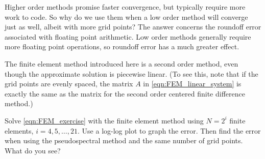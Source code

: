 \begin{problem}
\label{prob:FEM_accuracy_comparison}
Higher order methods promise faster convergence, but typically require more work to code.
So why do we use them when a low order method will converge just as well, albeit with more grid points?
The answer concerns the roundoff error associated with floating point arithmetic.
Low order methods generally require more floating point operations, so roundoff error has a much greater effect.

The finite element method introduced here is a second order method, even though the approximate solution is piecewise linear.
(To see this, note that if the grid points are evenly spaced, the matrix $A$ in \eqref{eqn:FEM_linear_system} is exactly the same as the matrix for the second order centered finite difference method.)

Solve \eqref{eqn:FEM_exercise} with the finite element method using $N = 2^i$  finite elements, $i = 4, 5, \ldots, 21$.
Use a log-log plot to graph the error.
Then find the error when using the pseudospectral method and the same number of grid points.
What do you see?
\end{problem}


